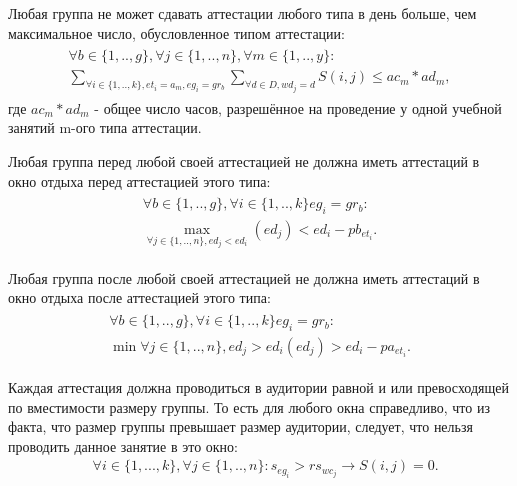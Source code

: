 Любая группа не может сдавать аттестации любого типа в день больше, чем максимальное число, обусловленное типом аттестации:
\begin{align}
	\begin{multlined}
		\forall b \in \{1,..,g\}, \forall j \in \{1,..,n\}, \forall m \in \{1,..,y\} :\\ \sum_{\forall i \in \{1,..,k\}, et_i = a_m,  eg_i=gr_b}\sum_{ \forall d \in D, wd_j = d }S(i,j) \leq ac_m * ad_m,
	\end{multlined}
\end{align}
где $ac_m * ad_m$ - общее число часов, разрешённое на проведение у одной учебной занятий m-ого типа аттестации.

Любая группа перед любой своей аттестацией не должна иметь аттестаций в окно отдыха перед аттестацией этого типа:
\begin{align}
	\begin{multlined}
		\forall b \in \{1,..,g\}, \forall i \in \{1,..,k\} eg_i=gr_b:\\
		\max_{\forall j \in \{1,..,n\}, ed_j < ed_i}(ed_j) <ed_i-pb_{et_i}.
	\end{multlined}
\end{align}

Любая группа после любой своей аттестацией не должна иметь аттестаций в окно отдыха после аттестацией этого типа:
\begin{align}
	\begin{multlined}
		\forall b \in \{1,..,g\}, \forall i \in \{1,..,k\} eg_i=gr_b:\\
		\min{\forall j \in \{1,..,n\}, ed_j > ed_i}(ed_j) >ed_i-pa_{et_i}.
	\end{multlined}
\end{align}


Каждая аттестация должна проводиться в аудитории равной и или превосходящей по вместимости размеру группы. То есть для любого окна справедливо, что из факта, что размер группы превышает размер аудитории, следует, что нельзя проводить данное занятие в это окно:
\begin{align}
	& \forall i \in \{1,...,k\}, \forall j \in \{1,..,n\} : s_{eg_i} > rs_{wc_j} \rightarrow S(i,j) = 0.
\end{align}

